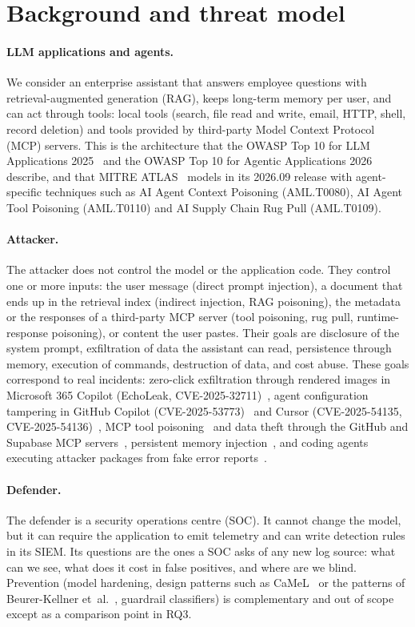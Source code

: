 \section{Background and threat model}
\label{sec:background}

\paragraph{LLM applications and agents.}
We consider an enterprise assistant that answers employee questions with retrieval-augmented
generation (RAG), keeps long-term memory per user, and can act through tools: local tools (search,
file read and write, email, HTTP, shell, record deletion) and tools provided by third-party Model
Context Protocol (MCP) servers. This is the architecture that the OWASP Top 10 for LLM Applications
2025~\cite{owasp-llm-2025} and the OWASP Top 10 for Agentic Applications 2026~\cite{owasp-agentic-2026}
describe, and that MITRE ATLAS~\cite{atlas} models in its 2026.09 release with agent-specific
techniques such as AI Agent Context Poisoning (AML.T0080), AI Agent Tool Poisoning (AML.T0110) and
AI Supply Chain Rug Pull (AML.T0109).

\paragraph{Attacker.}
The attacker does not control the model or the application code. They control one or more inputs:
the user message (direct prompt injection), a document that ends up in the retrieval index (indirect
injection, RAG poisoning), the metadata or the responses of a third-party MCP server (tool poisoning,
rug pull, runtime-response poisoning), or content the user pastes. Their goals are disclosure of the
system prompt, exfiltration of data the assistant can read, persistence through memory, execution
of commands, destruction of data, and cost abuse. These goals correspond to real incidents: zero-click
exfiltration through rendered images in Microsoft 365 Copilot (EchoLeak, CVE-2025-32711)~\cite{echoleak},
agent configuration tampering in GitHub Copilot (CVE-2025-53773)~\cite{copilot-rce} and Cursor
(CVE-2025-54135, CVE-2025-54136)~\cite{mcpoison}, MCP tool poisoning~\cite{invariant-tp} and data theft
through the GitHub and Supabase MCP servers~\cite{invariant-github,supabase-mcp}, persistent memory
injection~\cite{spaiware,unit42-memory}, and coding agents executing attacker packages from fake error
reports~\cite{agentjacking}.

\paragraph{Defender.}
The defender is a security operations centre (SOC). It cannot change the model, but it can require
the application to emit telemetry and can write detection rules in its SIEM. Its questions are the
ones a SOC asks of any new log source: what can we see, what does it cost in false positives, and
where are we blind. Prevention (model hardening, design patterns such as CaMeL~\cite{camel} or the
patterns of Beurer-Kellner et~al.~\cite{design-patterns}, guardrail classifiers) is complementary and
out of scope except as a comparison point in RQ3.
